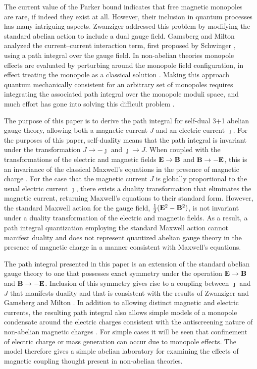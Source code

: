 \documentclass[a4paper,a4paper]{article}
\begin{document}
The current value of the Parker bound \cite{Freese} indicates that free magnetic monopoles are rare, if indeed they exist at all. However, their inclusion in quantum processes has many intriguing aspects.  Zwanziger \cite{Zwanziger} addressed this problem by modifying the standard abelian action to include a dual gauge field. Gamsberg and Milton \cite{GamsbergMilton} analyzed the current--current interaction term, first proposed by Schwinger \cite{Schwinger}, using a path integral over the gauge field. In non-abelian theories monopole effects are evaluated by perturbing around the monopole field configuration, in effect treating the monopole as a classical solution \cite{Coleman}.  Making this approach quantum mechanically consistent for an arbitrary set of monopoles requires integrating the associated path integral over the monopole moduli space, and much effort has gone into solving this difficult problem \cite{PaisSchroers}.  

The purpose of this paper is to derive the path integral for self-dual 3+1 abelian gauge theory,  allowing both a magnetic current $J$ and an electric current $\jmath$.  For the purposes of this paper, self-duality means that the path integral is invariant under the transformation $J \rightarrow - \jmath$ and $\jmath \rightarrow J$.  When coupled with the transformations of the electric and magnetic fields ${\bf E} \rightarrow {\bf B}$ and ${\bf B} \rightarrow - {\bf E}$, this is an invariance of the classical Maxwell's equations in the presence of magnetic charge \cite{Jackson}. For the case that the magnetic current $J$ is globally proportional to the usual electric current $\jmath$, there exists a duality transformation that eliminates the magnetic current, returning Maxwell's equations to their standard form.  However, the standard Maxwell action for the gauge field, $\frac{1}{2} ( {\bf E}^2 - {\bf B}^2 )$, is not invariant under a duality transformation of the electric and magnetic fields. As a result, a path integral quantization employing the standard Maxwell action cannot manifest duality and does not represent quantized abelian gauge theory in the presence of magnetic charge in a manner consistent with Maxwell's equations.

The path integral presented in this paper is an extension of the standard abelian gauge theory  to one that possesses exact symmetry under the operation ${\bf E} \rightarrow {\bf B}$ and ${\bf B} \rightarrow - {\bf E}$.  Inclusion of this symmetry gives rise to a coupling between $\jmath$ and $J$ that manifests duality and that is consistent with the results of Zwanziger \cite{Zwanziger} and Gamsberg and Milton \cite{GamsbergMilton}. In addition to allowing distinct magnetic and electric currents, the resulting path integral also allows simple models of a  monopole condensate around the electric charges consistent with the antiscreening nature of non-abelian magnetic charges \cite{Goebel}. For simple cases it will be seen that confinement of electric charge or mass generation can occur due to monopole effects. The model therefore gives a simple abelian laboratory for examining the effects of magnetic coupling thought present in non-abelian theories.
\end{document}
